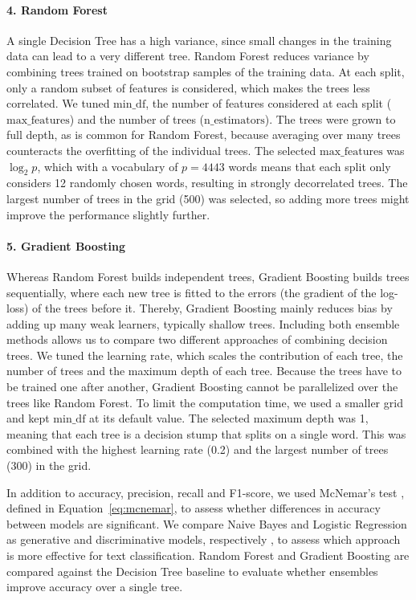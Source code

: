 \documentclass[pmlr]{jmlr}%
\begin{document}
\paragraph{4. Random Forest} \citep{Breiman2001}
A single Decision Tree has a high variance, since small changes in the training data can lead to a very different tree.
Random Forest reduces variance by combining trees trained on bootstrap samples of the training data. At each split, only a random subset of features is considered, which makes the trees less correlated.
We tuned $\text{min\_df}$, the number of features considered at each split ($\text{max\_features}$) and the number of trees ($\text{n\_estimators}$).
The trees were grown to full depth, as is common for Random Forest, because averaging over many trees counteracts the overfitting of the individual trees.
The selected $\text{max\_features}$ was $\log_2 p$, which with a vocabulary of $p = 4443$ words means that each split only considers 12 randomly chosen words, resulting in strongly decorrelated trees.
The largest number of trees in the grid (500) was selected, so adding more trees might improve the performance slightly further.

\paragraph{5. Gradient Boosting} \citep{4a848dd1-54e3-3c3c-83c3-04977ded2e71}
Whereas Random Forest builds independent trees, Gradient Boosting builds trees sequentially, where each new tree is fitted to the errors (the gradient of the log-loss) of the trees before it.
Thereby, Gradient Boosting mainly reduces bias by adding up many weak learners, typically shallow trees.
Including both ensemble methods allows us to compare two different approaches of combining decision trees.
We tuned the learning rate, which scales the contribution of each tree, the number of trees and the maximum depth of each tree.
Because the trees have to be trained one after another, Gradient Boosting cannot be parallelized over the trees like Random Forest.
To limit the computation time, we used a smaller grid and kept $\text{min\_df}$ at its default value.
The selected maximum depth was 1, meaning that each tree is a decision stump that splits on a single word.
This was combined with the highest learning rate (0.2) and the largest number of trees (300) in the grid.

In addition to accuracy, precision, recall and F1-score, we used McNemar's test \citep{Dietterich1998}, defined in Equation~\eqref{eq:mcnemar}, to assess whether differences in accuracy between models are significant.
We compare Naive Bayes and Logistic Regression as generative and discriminative models, respectively \citep{Ng2001}, to assess which approach is more effective for text classification. 
Random Forest and Gradient Boosting are compared against the Decision Tree baseline to evaluate whether ensembles improve accuracy over a single tree.
\end{document}
